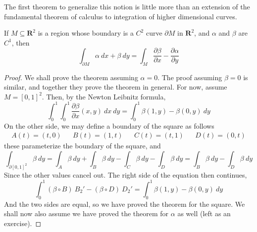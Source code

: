 The first theorem to generalize this notion is little more than an extension of the fundamental theorem of calculus to integration of higher dimensional curves.

\begin{theorem}
    If $M \subseteq \mathbf{R}^2$ is a region whose boundary is a $C^2$ curve $\partial M$ in $\mathbf{R}^2$, and $\alpha$ and $\beta$ are $C^1$, then
    \[ \int_{\partial M} \alpha\ dx + \beta\ dy = \int_M \frac{\partial \beta}{\partial x} - \frac{\partial \alpha}{\partial y} \]
\end{theorem}
\begin{proof}
    We shall prove the theorem assuming $\alpha = 0$. The proof assuming $\beta = 0$ is similar, and together they prove the theorem in general. For now, assume $M = [0,1]^2$. Then, by the Newton Leibnitz formula,
    \[ \int_0^1 \int_0^1 \frac{\partial \beta}{\partial x}(x,y)\ dx\ dy = \int_0^1 \beta(1,y) - \beta(0,y)\ dy \]
    On the other side, we may define a boundary of the square as follows
    \begin{align*}
        A(t) = (t,0) && B(t) = (1,t) && C(t) = (t,1) && D(t) = (0,t)
    \end{align*}
    these parameterize the boundary of the square, and
    \[ \int_{\partial [0,1]^2} \beta\ dy = \int_A \beta\ dy + \int_B \beta\ dy - \int_C \beta\ dy - \int_D \beta\ dy = \int_B \beta\ dy - \int_D \beta\ dy \]
    Since the other values cancel out. The right side of the equation then continues,
    \[ \int_0^1 (\beta \circ B)\ B_2' - (\beta \circ D)\ D_2' = \int_0^1 \beta(1,y) - \beta(0,y)\ dy \]
    And the two sides are equal, so we have proved the theorem for the square. We shall now also assume we have proved the theorem for $\alpha$ as well (left as an exercise).


\end{proof}
